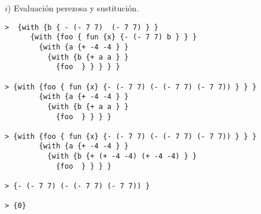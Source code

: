 $i$) Evaluación perezosa y sustitución. \newline

\begin{lstlisting}
>  {with {b { - (- 7 7)  (- 7 7) } }
      {with {foo { fun {x} {- (- 7 7) b } } }
        {with {a {+ -4 -4 } }
          {with {b {+ a a } }
            {foo  } } } } }

> {with {foo { fun {x} {- (- 7 7) (- (- 7 7) (- 7 7)) } } }
        {with {a {+ -4 -4 } }
          {with {b {+ a a } }
            {foo  } } } }

> {with {foo { fun {x} {- (- 7 7) (- (- 7 7) (- 7 7)) } } }
        {with {a {+ -4 -4 } }
          {with {b {+ (+ -4 -4) (+ -4 -4) } }
            {foo  } } } }

> {- (- 7 7) (- (- 7 7) (- 7 7)) }

> {0}
\end{lstlisting} \newpage

